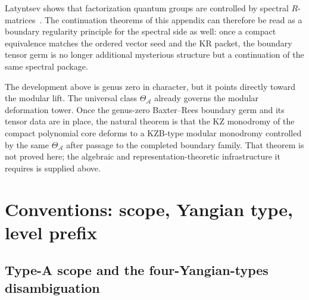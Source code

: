 \begin{remark}
\label{rem:relation-factorization-quantum-groups}
Latyntsev shows that factorization quantum groups are controlled by
spectral $R$-matrices~\cite{Latyntsev23}. The continuation theorems of
this appendix can therefore be read as a boundary regularity principle for
the spectral side as well: once a compact equivalence matches the ordered
vector seed and the KR packet, the boundary tensor germ is no longer
additional mysterious structure but a continuation of the same spectral
package.
\end{remark}

\begin{remark}
\label{rem:modular-lift-beyond-boundary}
The development above is genus zero in character, but it points directly
toward the modular lift. The universal class
$\Theta_{\mathcal A}$ already governs the modular deformation tower. Once
the genus-zero Baxter--Rees boundary germ and its tensor data are in
place, the natural theorem is that the KZ monodromy of the compact
polynomial core deforms to a KZB-type modular monodromy controlled by the
same $\Theta_{\mathcal A}$ after passage to the completed boundary family.
That theorem is not proved here; the algebraic and
representation-theoretic infrastructure it requires is supplied above.
\end{remark}

\section{Conventions: scope, Yangian type, level prefix}
\label{sec:typeA-baxter-rees-conventions}

\subsection{Type-A scope and the four-Yangian-types disambiguation}
\label{subsec:typeA-baxter-rees-yangian-types}

